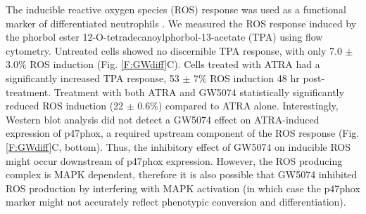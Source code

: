 \documentclass[12pt]{article}
\begin{document}
The inducible reactive oxygen species (ROS) response was used as a functional marker of differentiated neutrophils \cite{Congleton2011}.
We measured the ROS response induced by the phorbol ester 12-O-tetradecanoylphorbol-13-acetate (TPA) using flow cytometry.
Untreated cells showed no discernible TPA response, 
with only 7.0 $\pm$ 3.0\% ROS induction (Fig. \ref{F:GWdiff}C).
Cells treated with ATRA had a significantly increased TPA response, 53 $\pm$ 7\% ROS induction 48 hr post-treatment.
Treatment with both ATRA and GW5074 statistically significantly reduced ROS induction (22 $\pm$ 0.6\%) compared to ATRA alone. 
Interestingly, Western blot analysis did not detect a GW5074 effect on ATRA-induced expression of p47phox, 
a required upstream component of the ROS response  (Fig. \ref{F:GWdiff}C, bottom).
Thus, the inhibitory effect of GW5074 on inducible ROS might occur downstream of p47phox expression.
However, the ROS producing complex is MAPK dependent, 
therefore it is also possible that GW5074 inhibited ROS production by interfering 
with MAPK activation (in which case the p47phox marker might not accurately reflect phenotypic conversion and differentiation).

\clearpage
\end{document}
